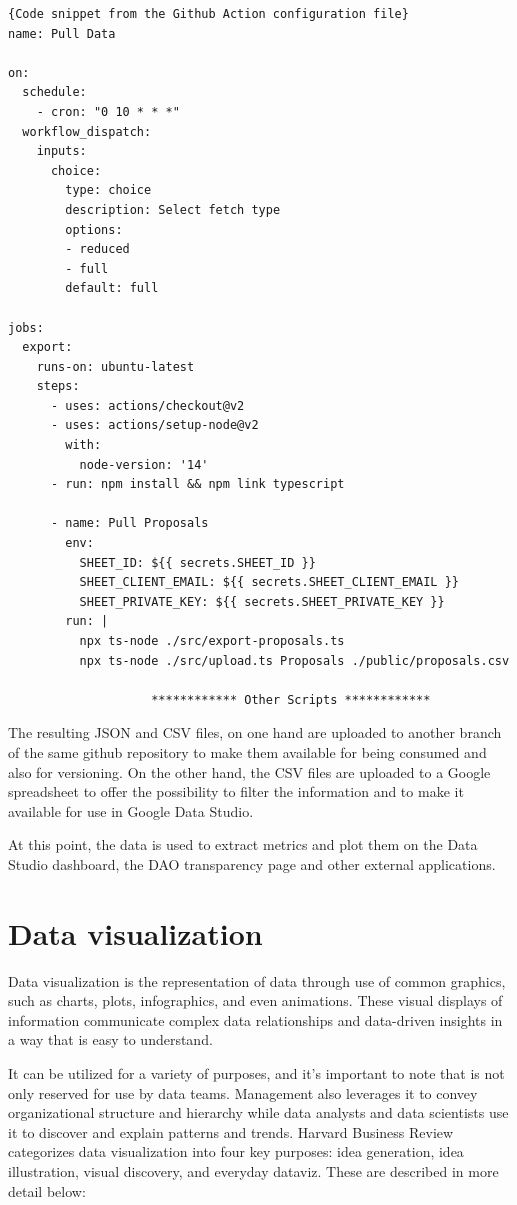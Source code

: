 \documentclass[MSE,Master,english]{twbook}%
\begin{document}
\begin{lstlisting}{Code snippet from the Github Action configuration file}
name: Pull Data

on:
  schedule:
    - cron: "0 10 * * *"
  workflow_dispatch:
    inputs:
      choice:
        type: choice
        description: Select fetch type
        options:
        - reduced
        - full
        default: full

jobs:
  export:
    runs-on: ubuntu-latest
    steps:
      - uses: actions/checkout@v2
      - uses: actions/setup-node@v2
        with:
          node-version: '14'
      - run: npm install && npm link typescript

      - name: Pull Proposals
        env:
          SHEET_ID: ${{ secrets.SHEET_ID }}
          SHEET_CLIENT_EMAIL: ${{ secrets.SHEET_CLIENT_EMAIL }}
          SHEET_PRIVATE_KEY: ${{ secrets.SHEET_PRIVATE_KEY }}
        run: |
          npx ts-node ./src/export-proposals.ts
          npx ts-node ./src/upload.ts Proposals ./public/proposals.csv

                    ************ Other Scripts ************
\end{lstlisting}

The resulting JSON and CSV files, on one hand are uploaded to another branch of the same github repository to make them available for being consumed and also for versioning. On the other hand, the CSV files are uploaded to a Google spreadsheet\cite{transparencySheet} to offer the possibility to filter the information and to make it available for use in Google Data Studio.

At this point, the data is used to extract metrics and plot them on the Data Studio dashboard, the DAO transparency page\cite{transparencyPage} and other external applications.

\section{Data visualization}
Data visualization\cite{dataviz} is the representation of data through use of common graphics, such as charts, plots, infographics, and even animations. These visual displays of information communicate complex data relationships and data-driven insights in a way that is easy to understand.

It can be utilized for a variety of purposes, and it's important to note that is not only reserved for use by data teams. Management also leverages it to convey organizational structure and hierarchy while data analysts and data scientists use it to discover and explain patterns and trends. Harvard Business Review\cite{hbr} categorizes data visualization into four key purposes: idea generation, idea illustration, visual discovery, and everyday dataviz. These are described in more detail below:
\end{document}
